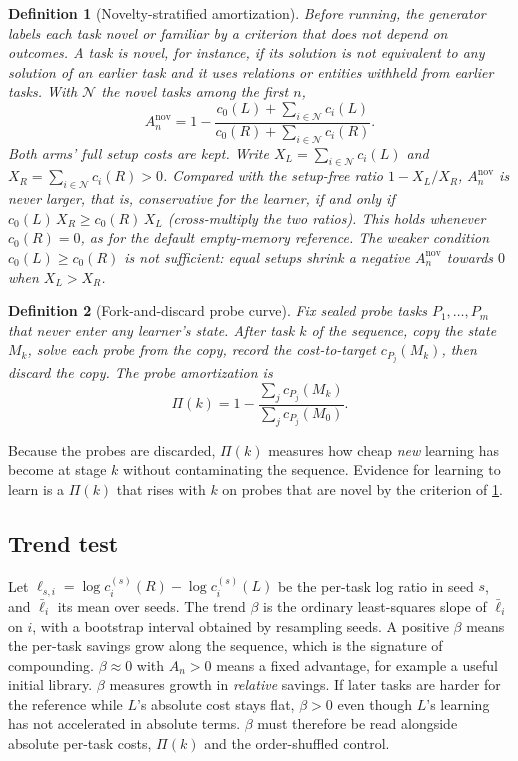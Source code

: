 \documentclass[11pt]{article}
\newtheorem{definition}{Definition}
\theoremstyle{remark}
\newcommand{\cN}{\mathcal{N}}
\begin{document}
\begin{definition}[Novelty-stratified amortization]\label{def:novel}
Before running, the generator labels each task \emph{novel} or \emph{familiar} by a criterion that does not depend on outcomes. A task is novel, for instance, if its solution is not equivalent to any solution of an earlier task and it uses relations or entities withheld from earlier tasks.
With $\cN$ the novel tasks among the first $n$,
\[
A_n^{\mathrm{nov}} = 1-\frac{c_0(L)+\sum_{i\in\cN}c_i(L)}{c_0(R)+\sum_{i\in\cN}c_i(R)}.
\]
Both arms' full setup costs are kept. Write $X_L=\sum_{i\in\cN}c_i(L)$ and $X_R=\sum_{i\in\cN}c_i(R)>0$. Compared with the setup-free ratio $1-X_L/X_R$, $A_n^{\mathrm{nov}}$ is never larger, that is, conservative for the learner, if and only if $c_0(L)\,X_R\ge c_0(R)\,X_L$ (cross-multiply the two ratios). This holds whenever $c_0(R)=0$, as for the default empty-memory reference. The weaker condition $c_0(L)\ge c_0(R)$ is \emph{not} sufficient: equal setups shrink a negative $A^{\mathrm{nov}}_n$ towards $0$ when $X_L>X_R$.
\end{definition}

\begin{definition}[Fork-and-discard probe curve]\label{def:probe}
Fix sealed probe tasks $P_1,\dots,P_m$ that never enter any learner's state.
After task $k$ of the sequence, copy the state $M_k$, solve each probe from the copy, record the cost-to-target $c_{P_j}(M_k)$, then discard the copy.
The probe amortization is
\[
\Pi(k) = 1-\frac{\sum_j c_{P_j}(M_k)}{\sum_j c_{P_j}(M_0)} .
\]
\end{definition}
Because the probes are discarded, $\Pi(k)$ measures how cheap \emph{new} learning has become at stage $k$ without contaminating the sequence.
Evidence for learning to learn is a $\Pi(k)$ that rises with $k$ on probes that are novel by the criterion of \cref{def:novel}.

\subsection{Trend test}\label{sec:trend}
Let $\ell_{s,i} = \log c_i^{(s)}(R)-\log c_i^{(s)}(L)$ be the per-task log ratio in seed $s$, and $\bar\ell_i$ its mean over seeds.
The trend $\beta$ is the ordinary least-squares slope of $\bar\ell_i$ on $i$, with a bootstrap interval obtained by resampling seeds.
A positive $\beta$ means the per-task savings grow along the sequence, which is the signature of compounding.
$\beta\approx 0$ with $A_n>0$ means a fixed advantage, for example a useful initial library.
$\beta$ measures growth in \emph{relative} savings. If later tasks are harder for the reference while $L$'s absolute cost stays flat, $\beta>0$ even though $L$'s learning has not accelerated in absolute terms. $\beta$ must therefore be read alongside absolute per-task costs, $\Pi(k)$ and the order-shuffled control.
\end{document}

